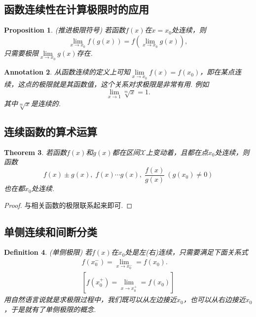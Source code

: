 \documentclass{article}
\newtheorem{theorem}{Theorem}[section]
\newtheorem{proposition}[theorem]{Proposition}
\newtheorem{definition}[theorem]{Definition}
\newtheorem{annotation}[theorem]{Annotation}
\begin{document}
\subsection{函数连续性在计算极限时的应用}

\begin{proposition}
\rm {\color{red} (推进极限符号)} 若函数$f(x)$在$x = x_0$处连续，则
$$
\lim\limits_{x \rightarrow x_0} f(g(x)) = f(\lim\limits_{x \rightarrow x_0}g(x)),
$$
只需要极限$\lim\limits_{x \rightarrow x_0}g(x)$存在.
\end{proposition}

\begin{annotation}
\rm 从函数连续的定义上可知$\lim\limits_{x \rightarrow x_0}f(x) = f(x_0)$，即在某点连续，这点的极限就是其函数值，这个关系对求极限是非常有用. 例如
$$
\lim\limits_{x \rightarrow 1} \sqrt[m]{x} = 1.
$$
其中$\sqrt[m]{x}$是连续的.
\end{annotation}


\subsection{连续函数的算术运算}

\begin{theorem}
\rm 若函数$f(x)$和$g(x)$都在区间$\mathcal{X}$上变动着，且都在点$x_0$处连续，则函数
$$
f(x) \pm g(x),\; f(x)\cdots g(x), \; \frac{f(x)}{g(x)}~(g(x_0) \neq 0)
$$
也在都$x_0$处连续.
\end{theorem}

\begin{proof}
{\color{blue}与相关函数的极限联系起来即可}.
\end{proof}

\subsection{单侧连续和间断分类}

\begin{definition}
\rm {\color{red} (单侧极限) }若$f(x)$在$x_0$处是左(右)连续，只需要满足下面关系式
$$
\begin{array}{ll}
f(x_0^-) = \lim\limits_{x \rightarrow x_0^-} = f(x_0). \\
\left[ f(x_0^+) = \lim\limits_{x \rightarrow x_0^+} = f(x_0) \right]
\end{array}
$$
{\color{blue}用自然语言说就是求极限过程中，我们既可以从左边接近$x_0$，也可以从右边接近$x_0$，于是就有了单侧极限的概念}.
\end{definition}
\end{document}
